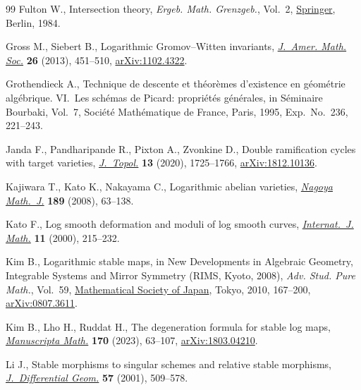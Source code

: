 \documentclass[pdftex]{sigma}
\numberwithin{equation}{section}
\theoremstyle{definition}
\begin{document}
\begin{thebibliography}{99}
Fulton W., Intersection theory, \textit{Ergeb. Math. Grenzgeb.}, Vol.~2,
 \href{https://doi.org/10.1007/978-3-662-02421-8}{Springer}, Berlin, 1984.

Gross M., Siebert B., Logarithmic {G}romov--{W}itten invariants,
 \href{https://doi.org/10.1090/S0894-0347-2012-00757-7}{\textit{J.~Amer. Math.
 Soc.}} \textbf{26} (2013), 451--510,
 \href{http://arxiv.org/abs/1102.4322}{arXiv:1102.4322}.

Grothendieck A., Technique de descente et th\'eor\`emes d'existence en
 g\'eom\'etrie alg\'ebrique. {VI}.~{L}es sch\'emas de {P}icard: propri\'et\'es
 g\'en\'erales, in S\'eminaire {B}ourbaki, {V}ol.~7, Soci\'et\'e
 Math\'ematique de France, Paris, 1995, Exp.~No.~236, 221--243.

Janda F., Pandharipande R., Pixton A., Zvonkine D., Double ramification cycles
 with target varieties,
 \href{https://doi.org/10.1112/topo.12174}{\textit{J.~Topol.}} \textbf{13}
 (2020), 1725--1766, \href{http://arxiv.org/abs/1812.10136}{arXiv:1812.10136}.

Kajiwara T., Kato K., Nakayama C., Logarithmic abelian varieties,
 \href{https://doi.org/10.1017/S002776300000951X}{\textit{Nagoya Math.~J.}}
 \textbf{189} (2008), 63--138.

Kato F., Log smooth deformation and moduli of log smooth curves,
 \href{https://doi.org/10.1142/S0129167X0000012X}{\textit{Internat.~J. Math.}}
 \textbf{11} (2000), 215--232.

Kim B., Logarithmic stable maps, in New {D}evelopments in {A}lgebraic
 {G}eometry, {I}ntegrable {S}ystems and {M}irror {S}ymmetry ({RIMS}, {K}yoto,
 2008), \textit{Adv. Stud. Pure Math.}, Vol.~59,
 \href{https://doi.org/10.2969/aspm/05910167}{Mathematical Society of Japan},
 Tokyo, 2010, 167--200,
 \href{http://arxiv.org/abs/0807.3611}{arXiv:0807.3611}.

Kim B., Lho H., Ruddat H., The degeneration formula for stable log maps,
 \href{https://doi.org/10.1007/s00229-021-01361-z}{\textit{Manuscripta Math.}}
 \textbf{170} (2023), 63--107,
 \href{http://arxiv.org/abs/1803.04210}{arXiv:1803.04210}.

Li J., Stable morphisms to singular schemes and relative stable morphisms,
 \href{https://doi.org/10.4310/jdg/1090348132}{\textit{J.~Differential Geom.}}
 \textbf{57} (2001), 509--578.


\end{thebibliography}
\end{document}
